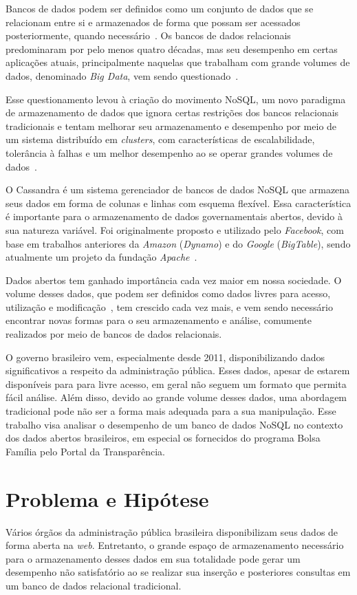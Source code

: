Bancos de dados podem ser definidos como um conjunto de dados que se relacionam entre si e armazenados de forma que possam ser acessados posteriormente, quando necessário~\cite{cjdate}.
Os bancos de dados relacionais predominaram por pelo menos quatro décadas, mas seu desempenho em certas aplicações atuais, principalmente naquelas que trabalham com grande volumes de dados, denominado \emph{Big Data}, vem sendo questionado~\cite{pramod}. 

Esse questionamento levou à criação do movimento NoSQL, um novo paradigma de armazenamento de dados que ignora certas restrições dos bancos relacionais tradicionais e tentam melhorar seu armazenamento e desempenho por meio de um sistema distribuído em \emph{clusters}, com características de escalabilidade, tolerância à falhas e um melhor desempenho ao se operar grandes volumes de dados~\cite{pramod}.

O Cassandra é um sistema gerenciador de bancos de dados NoSQL que armazena seus dados em forma de colunas e linhas com esquema flexível. Essa característica é importante para o armazenamento de dados governamentais abertos, devido à sua natureza variável. Foi originalmente proposto e utilizado pelo \emph{Facebook}, com base em trabalhos anteriores da \emph{Amazon} (\emph{Dynamo}) e do \emph{Google} (\emph{BigTable}), sendo atualmente um projeto da fundação \emph{Apache}~\cite{cassandraguide}.

Dados abertos tem ganhado importância cada vez maior em nossa sociedade. O volume desses dados, que podem ser definidos como dados livres para acesso, utilização e modificação~\cite{opendefinition}, tem crescido cada vez mais, e vem sendo necessário encontrar novas formas para o seu armazenamento e análise, comumente realizados por meio de bancos de dados relacionais.

O governo brasileiro vem, especialmente desde 2011, disponibilizando dados significativos a respeito da administração pública. Esses dados, apesar de estarem disponíveis para para livre acesso, em geral não seguem um formato que permita fácil análise. Além disso, devido ao grande volume desses dados, uma abordagem tradicional pode não ser a forma mais adequada para a sua manipulação. Esse trabalho visa analisar o desempenho de um banco de dados NoSQL no contexto dos dados abertos brasileiros, em especial os fornecidos do programa Bolsa Família pelo Portal da Transparência.

\section{Problema e Hipótese}
Vários órgãos da administração pública brasileira disponibilizam seus dados de forma aberta na \emph{web}. Entretanto, o grande espaço de armazenamento necessário para o armazenamento desses dados em sua totalidade pode gerar um desempenho não satisfatório ao se realizar sua inserção e posteriores consultas em um banco de dados relacional tradicional.

